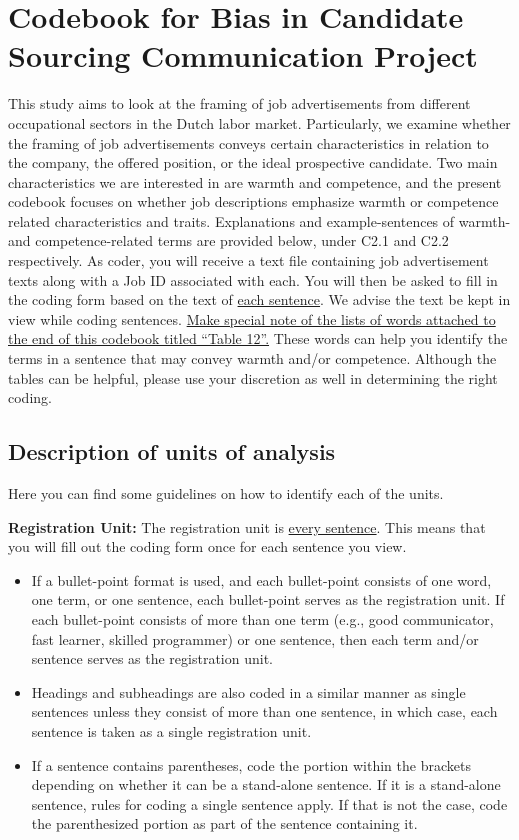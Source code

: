 \documentclass[Royal,sageapa,times]{sagej}
\begin{document}
\section{Codebook for Bias in Candidate Sourcing Communication Project\label{codebook}}
This study aims to look at the framing of job advertisements from different occupational sectors in the Dutch labor market. Particularly, we examine whether the framing of job advertisements conveys certain characteristics in relation to the company, the offered position, or the ideal prospective candidate. Two main characteristics we are interested in are warmth and competence, and the present codebook focuses on whether job descriptions emphasize warmth or competence related characteristics and traits. Explanations and example-sentences of warmth- and competence-related terms are provided below, under C2.1 and C2.2 respectively.
As coder, you will receive a text file containing job advertisement texts along with a Job ID associated with each. You will then be asked to fill in the coding form based on the text of \uline{each sentence}. We advise the text be kept in view while coding sentences.
\uline{Make special note of the lists of words attached to the end of this codebook titled “Table 12”.} These words can help you identify the terms in a sentence that may convey warmth and/or competence. Although the tables can be helpful, please use your discretion as well in determining the right coding.

\subsection{Description of units of analysis\label{description_of_units_of_analysis}}
Here you can find some guidelines on how to identify each of the units.

\noindent\textbf{Registration Unit:} The registration unit is \uline{every sentence}. This means that you will fill out the coding form once for each sentence you view.
\begin{itemize}
    \item If a bullet-point format is used, and each bullet-point consists of one word, one term, or one sentence, each bullet-point serves as the registration unit. If each bullet-point consists of more than one term (e.g., good communicator, fast learner, skilled programmer) or one sentence, then each term and/or sentence serves as the registration unit.
    \item Headings and subheadings are also coded in a similar manner as single sentences unless they consist of more than one sentence, in which case, each sentence is taken as a single registration unit.
    \item If a sentence contains parentheses, code the portion within the brackets depending on whether it can be a stand-alone sentence. If it is a stand-alone sentence, rules for coding a single sentence apply. If that is not the case, code the parenthesized portion as part of the sentence containing it.
    \end{itemize}
\end{document}
